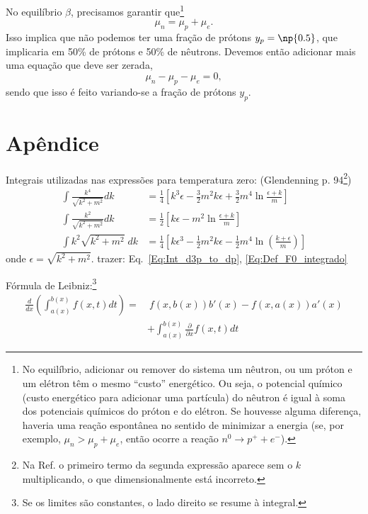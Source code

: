 No equilíbrio $\beta$, precisamos garantir que\footnote{No equilíbrio, adicionar ou remover do sistema um nêutron, ou um próton e um elétron têm o mesmo ``custo'' energético. Ou seja, o potencial químico (custo energético para adicionar uma partícula) do nêutron é igual à soma dos potenciais químicos do próton e do elétron. Se houvesse alguma diferença, haveria uma reação espontânea no sentido de minimizar a energia (se, por exemplo, $\mu_n > \mu_p + \mu_e$, então ocorre a reação $n^0 \to p^+ + e^-$).}
\begin{equation}
	\mu_n = \mu_p + \mu_e.
\end{equation}
%
Isso implica que não podemos ter uma fração de prótons $y_p = \np{0.5}$, que implicaria em 50\% de prótons e 50\% de nêutrons. Devemos então adicionar mais uma equação que deve ser zerada,
\begin{equation}
	\mu_n - \mu_p - \mu_e = 0,
\end{equation}
%
sendo que isso é feito variando-se a fração de prótons $y_p$.

\section{Apêndice}

Integrais utilizadas nas expressões para temperatura zero: (Glendenning\cite{Glendenning} p. 94\footnote{Na Ref. o primeiro termo da segunda expressão aparece sem o $k$ multiplicando, o que dimensionalmente está incorreto.})
\begin{align}
	\int \frac{k^4}{\sqrt{k^2 + m^2}} dk &= \frac{1}{4}\left[k^3\epsilon - \frac{3}{2} m^2k\epsilon + \frac{3}{2}m^4\ln\frac{\epsilon + k}{m} \right] \label{Eq:Integ_momento_quarta}\\
	\int \frac{k^2}{\sqrt{k^2 + m^2}} dk &= \frac{1}{2}\left[k\epsilon - m^2\ln\frac{\epsilon + k}{m}\right] \label{Eq:Integ_momento_quad} \\
	\int k^2 \sqrt{k^2 + m^2} \;dk &= \frac{1}{4}\left[k \epsilon^3 - \frac{1}{2} m^2 k \epsilon - \frac{1}{2} m^4\ln\left(\frac{k+\epsilon}{m}\right)\right] \label{Eq:Def_F_E}
\end{align}
%
onde $\epsilon = \sqrt{k^2+m^2}$. 
trazer: Eq.~\ref{Eq:Int_d3p_to_dp}, \eqref{Eq:Def_F0_integrado}

Fórmula de Leibniz:\footnote{Se os limites são constantes, o lado direito se resume à integral.}
\begin{equation}\label{Eq:Form_Leibniz}
\begin{split}
	\frac{d}{dx} \left(\int_{a(x)}^{b(x)} f(x,t) dt\right) =&~ f(x, b(x))b'(x) - f(x, a(x))a'(x) \\
	&+ \int_{a(x)}^{b(x)}\frac{\partial}{\partial x}f(x,t) dt
\end{split}
\end{equation}

